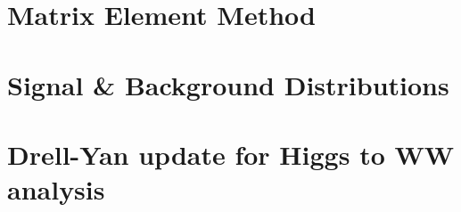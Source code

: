 \documentclass{cmspaper}
\begin{document}

  \section{Matrix Element Method}
     \label{app:matrixelement}
     
  \clearpage
  \section{Signal \& Background Distributions}
     \label{app:mvaplots}
     
  \clearpage
  \section{Drell-Yan update for Higgs to WW analysis}
     \label{app:dy_writeup}
     

  \clearpage
\end{document}
